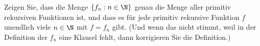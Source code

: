 
\begin{exercise}[205]

Zeigen Sie, dass die Menge $\{f_n: n \in \N\}$ genau die Menge aller primitiv
rekursiven Funktionen ist, und dass es für jede primitiv rekursive Funktion $f$
unendlich viele $n \in \N$ mit $f = f_n$ gibt. (Und wenn das nicht stimmt,
weil in der Definition der $f_n$ eine Klausel fehlt, dann korrigieren Sie
die Definition.)

\end{exercise}


\begin{solution}

\phantom{}

\end{solution}
